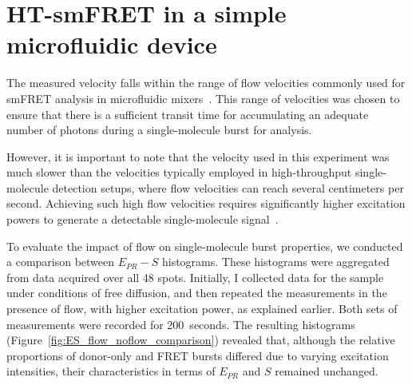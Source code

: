 \section{HT-smFRET in a simple microfluidic device}
\label{sec:smFRET_microfluidics}

The measured velocity falls within the range of flow velocities commonly used for \ac{smFRET} analysis in microfluidic mixers~\cite{lipman_science_2003, wunderlich_NP_2013}. 
This range of velocities was chosen to ensure that there is a sufficient transit time for accumulating an adequate number of photons during a single-molecule burst for analysis.

However, it is important to note that the velocity used in this experiment was much slower than the velocities typically employed in high-throughput single-molecule detection setups, where flow velocities can reach several centimeters per second. 
Achieving such high flow velocities requires significantly higher excitation powers to generate a detectable single-molecule signal~\cite{horrocks_AC_2012}.

To evaluate the impact of flow on single-molecule burst properties, we conducted a comparison between $E_{PR}-S$ histograms. 
These histograms were aggregated from data acquired over all 48 spots. 
Initially, I collected data for the sample under conditions of free diffusion, and then repeated the measurements in the presence of flow, with higher excitation power, as explained earlier. 
Both sets of measurements were recorded for 200~seconds. 
The resulting histograms (Figure~\ref{fig:ES_flow_noflow_comparison}) revealed that, although the relative proportions of donor-only and FRET bursts differed due to varying excitation intensities, their characteristics in terms of $E_{PR}$ and $S$ remained unchanged.

